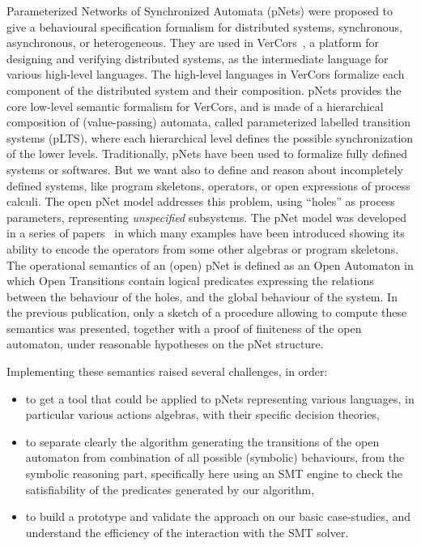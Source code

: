 \documentclass[smallcondensed]{svjour3}
\begin{document}
Parameterized Networks of Synchronized Automata (pNets) were proposed
to give a behavioural specification formalism for distributed
systems, synchronous, asynchronous, or heterogeneous. They are used in
VerCors~\cite{HKLM:Foclasa14}, a platform for designing and 
verifying distributed systems, as the intermediate language for various
high-level languages. The high-level languages in VerCors formalize
each component of the distributed system and their composition.
pNets provides the core low-level semantic formalism for VerCors, and
is made of a hierarchical composition of (value-passing) automata,
called parameterized labelled transition systems (pLTS), where each
hierarchical level defines the possible synchronization of the lower levels.
Traditionally, pNets have been used to formalize fully
defined systems or softwares. But we want also to define and reason
about incompletely defined systems, like program skeletons, operators,
or open expressions of process calculi.
The open pNet model addresses this problem, using
``holes'' as process parameters, representing \emph{unspecified} subsystems.
The pNet model was developed in a series of
papers~\cite{HMZ:PDP15,henrio:Forte2016} in which many examples have been
introduced showing its ability to encode the operators from some
other algebras or  program skeletons.
The operational semantics of an (open) pNet is defined as an
Open Automaton in which Open Transitions contain logical predicates
expressing the relations between the behaviour of the holes, and the
global behaviour of the system. In the previous publication,
only a sketch of a procedure allowing to compute these semantics was
presented, together with a proof of finiteness of the open automaton, under
reasonable hypotheses on the pNet structure.

Implementing these semantics raised several challenges, in order:
\begin{itemize}
  \item to get a tool that could be applied to pNets representing
    various languages, in particular various actions algebras,
    with their specific decision theories,
  \item to separate clearly the 
      algorithm generating the transitions of the open automaton from
      combination of all possible (symbolic) behaviours, from
      the symbolic reasoning part, specifically here using an SMT
      engine to check the
      satisfiability of the predicates generated by our algorithm,
  \item to build a prototype and validate the approach on our basic
    case-studies, and understand the efficiency of the interaction
    with the SMT solver.
\end{itemize}
\end{document}
